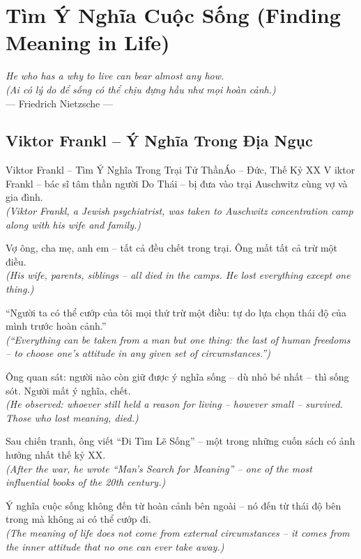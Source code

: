 \chapter{Tìm Ý Nghĩa Cuộc Sống (Finding Meaning in Life)}
\begin{center}
  \textit{\color{truyenblue}He who has a why to live can bear almost any how.}\\
  \textit{(Ai có lý do để sống có thể chịu đựng hầu như mọi hoàn cảnh.)}\\[4pt]
  \small\color{truyengold}--- Friedrich Nietzsche ---
\end{center}
\ngancach

\section{Viktor Frankl -- Ý Nghĩa Trong Địa Ngục}
\begin{truyen}{Viktor Frankl -- Tìm Ý Nghĩa Trong Trại Tử Thần}{Áo -- Đức, Thế Kỷ XX}
V iktor Frankl -- bác sĩ tâm thần người Do Thái -- bị đưa vào trại Auschwitz cùng vợ và gia đình.\\
\textit{(Viktor Frankl, a Jewish psychiatrist, was taken to Auschwitz concentration camp along with his wife and family.)}

Vợ ông, cha mẹ, anh em -- tất cả đều chết trong trại. Ông mất tất cả trừ một điều.\\
\textit{(His wife, parents, siblings -- all died in the camps. He lost everything except one thing.)}

``Người ta có thể cướp của tôi mọi thứ trừ một điều: tự do lựa chọn thái độ của mình trước hoàn cảnh.''\\
\textit{(``Everything can be taken from a man but one thing: the last of human freedoms -- to choose one's attitude in any given set of circumstances.'')}

Ông quan sát: người nào còn giữ được ý nghĩa sống -- dù nhỏ bé nhất -- thì sống sót. Người mất ý nghĩa, chết.\\
\textit{(He observed: whoever still held a reason for living -- however small -- survived. Those who lost meaning, died.)}

Sau chiến tranh, ông viết ``Đi Tìm Lẽ Sống'' -- một trong những cuốn sách có ảnh hưởng nhất thế kỷ XX.\\
\textit{(After the war, he wrote ``Man's Search for Meaning'' -- one of the most influential books of the 20th century.)}

\end{truyen}
\begin{baihoc}
  Ý nghĩa cuộc sống không đến từ hoàn cảnh bên ngoài -- nó đến từ thái độ bên trong mà không ai có thể cướp đi.\\
  \textit{(The meaning of life does not come from external circumstances -- it comes from the inner attitude that no one can ever take away.)}
\end{baihoc}

